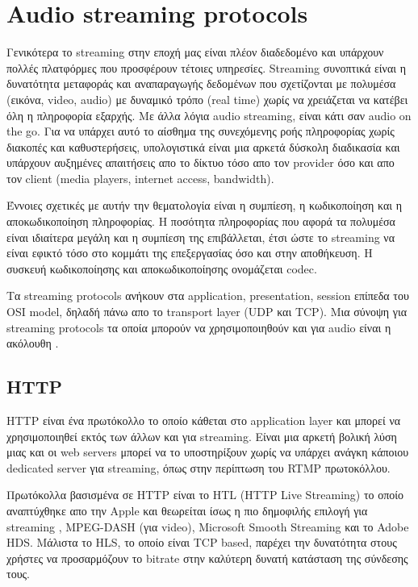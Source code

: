 \documentclass[hidelinks, 12pt, a4paper]{article}
\begin{document}
\section{Audio streaming protocols}

Γενικότερα το streaming στην εποχή μας είναι πλέον διαδεδομένο και υπάρχουν πολλές πλατφόρμες που προσφέρουν τέτοιες υπηρεσίες. Streaming συνοπτικά είναι η δυνατότητα μεταφοράς και αναπαραγωγής δεδομένων που σχετίζονται με πολυμέσα (εικόνα, video, audio) με δυναμικό τρόπο (real time) χωρίς να χρειάζεται να κατέβει όλη η πληροφορία εξαρχής. Με άλλα λόγια audio streaming, είναι κάτι σαν audio on the go. Για να υπάρχει αυτό το αίσθημα της συνεχόμενης ροής πληροφορίας χωρίς διακοπές και καθυστερήσεις, υπολογιστικά είναι μια αρκετά  δύσκολη διαδικασία  και υπάρχουν αυξημένες απαιτήσεις απο το δίκτυο τόσο απο τον provider όσο και απο τον client (media players, internet access, bandwidth). 

Έννοιες σχετικές με αυτήν την θεματολογία είναι η συμπίεση, η κωδικοποίηση και η αποκωδικοποίηση πληροφορίας. Η ποσότητα πληροφορίας που αφορά τα πολυμέσα είναι ιδιαίτερα μεγάλη και η συμπίεση της επιβάλλεται, έτσι ώστε το streaming να είναι εφικτό τόσο στο κομμάτι της επεξεργασίας όσο και στην αποθήκευση. Η συσκευή κωδικοποίησης και αποκωδικοποίησης ονομάζεται codec.

Τα streaming protocols ανήκουν στα application, presentation, session επίπεδα του OSI model, δηλαδή πάνω απο το transport layer (UDP και TCP). Μια σύνοψη για streaming protocols τα οποία μπορούν να χρησιμοποιηθούν και για audio είναι η ακόλουθη \cite{wowza, stackexchange_audio, wowza_rtsp}.

\subsection{HTTP}

HTTP είναι ένα πρωτόκολλο το οποίο κάθεται στο application layer και μπορεί να χρησιμοποιηθεί εκτός των άλλων και για streaming. Είναι μια αρκετή βολική λύση μιας και οι web servers μπορεί να το υποστηρίξουν χωρίς να υπάρχει ανάγκη κάποιου dedicated server για streaming, όπως στην περίπτωση του RTMP πρωτοκόλλου. 

Πρωτόκολλα βασισμένα σε HTTP είναι το HTL (HTTP Live Streaming) το οποίο αναπτύχθηκε απο την Apple και θεωρείται ίσως η πιο δημοφιλής επιλογή για streaming \cite{wiki_hls}, MPEG-DASH (για video), Microsoft Smooth Streaming και το Adobe HDS. Μάλιστα το HLS, το οποίο είναι TCP based, παρέχει την δυνατότητα στους χρήστες να προσαρμόζουν το bitrate στην καλύτερη δυνατή κατάσταση της σύνδεσης τους.
\end{document}
